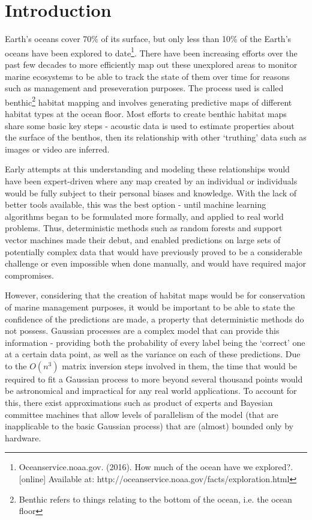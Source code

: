 \chapter{Introduction}

Earth's oceans cover 70\% of its surface, but only less than 10\% of the Earth's oceans have been explored to date\footnote{Oceanservice.noaa.gov. (2016). How much of the ocean have we explored?. [online] Available at: http://oceanservice.noaa.gov/facts/exploration.html}. There have been increasing efforts over the past few decades to more efficiently map out these unexplored areas to monitor marine ecosystems to be able to track the state of them over time for reasons such as management and preseveration purposes. The process used is called benthic\footnote{Benthic refers to things relating to the bottom of the ocean, i.e. the ocean floor} habitat mapping and involves generating predictive maps of different habitat types at the ocean floor. Most efforts to create benthic habitat maps share some basic key steps - acoustic data is used to estimate properties about the surface of the benthos, then its relationship with other `truthing' data such as images or video are inferred. 

Early attempts at this understanding and modeling these relationships would have been expert-driven where any map created by an individual or individuals would be fully subject to their personal biases and knowledge. With the lack of better tools available, this was the best option - until machine learning algorithms began to be formulated more formally, and applied to real world problems. Thus, deterministic methods such as random forests and support vector machines made their debut, and enabled predictions on large sets of potentially complex data that would have previously proved to be a considerable challenge or even impossible when done manually, and would have required major compromises. 

However, considering that the creation of habitat maps would be for conservation of marine management purposes, it would be important to be able to state the confidence of the predictions are made, a property that deterministic methods do not possess. Gaussian processes are a complex model that can provide this information - providing both the probability of every label being the `correct' one at a certain data point, as well as the variance on each of these predictions. Due to the $O(n^3)$ matrix inversion steps involved in them, the time that would be required to fit a Gaussian process to more beyond several thousand points would be astronomical and impractical for any real world applications. To account for this, there exist approximations such as product of experts and Bayesian committee machines that allow levels of parallelism of the model (that are inapplicable to the basic Gaussian process) that are (almost) bounded only by hardware. 

